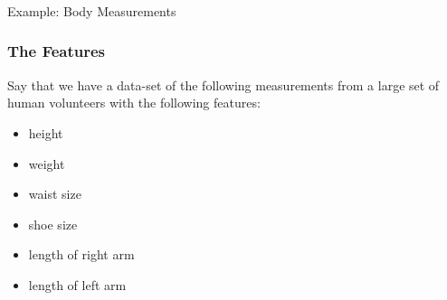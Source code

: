 








\begin{frame}[fragile]\frametitle{}
\begin{center}
{\Large Example: Body Measurements}
\end{center}
\end{frame}

\begin{frame}[fragile] \frametitle{The Features}

Say that we have a data-set of the following measurements from
a large set of human volunteers with the following features:
\begin{itemize}
\item height
\item weight
\item waist size
\item shoe size
\item length of right arm
\item length of left arm

\end{itemize}

\end{frame}

